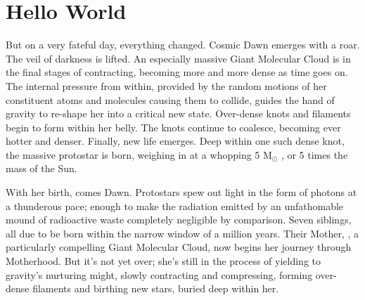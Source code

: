 \documentclass[main.tex]{subfiles}
\begin{document}
\section{Hello World} \label{hello}

\par \nar But on a very fateful day, everything changed.  Cosmic Dawn emerges with a roar.  The veil of darkness is lifted.  An especially massive Giant Molecular Cloud is in the final stages of contracting, becoming more and more dense as time goes on.  The internal pressure from within, provided by the random motions of her constituent atoms and molecules causing them to collide, guides the hand of gravity to re-shape her into a critical new state.  Over-dense knots and filaments begin to form within her belly.  The knots continue to coalesce, becoming ever hotter and denser.  Finally, new life emerges.  Deep within one such dense knot, the massive protostar \rmmaia is born, weighing in at a whopping 5 M$_{\odot}$ , or 5 times the mass of the Sun.

\par \nar With her birth, comes Dawn.  Protostars spew out light in the form of photons at a thunderous pace; enough to make the radiation emitted by an unfathomable mound of radioactive waste completely negligible by comparison.  Seven siblings, all due to be born within the narrow window of a million years. Their Mother, \rmpleione, a particularly compelling Giant Molecular Cloud, now begins her journey through Motherhood.  But it's not yet over; she's still in the process of yielding to gravity's nurturing might, slowly contracting and compressing, forming over-dense filaments and birthing new stars, buried deep within her.  

\end{document}
